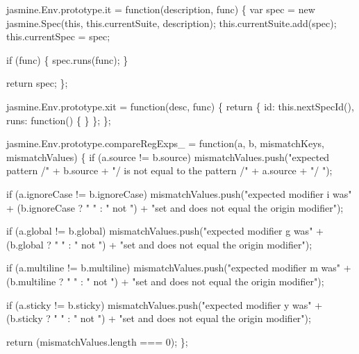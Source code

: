 \begin{DoxyCodeInclude}
jasmine.Env.prototype.it = \textcolor{keyword}{function}(description, func) \{
  var spec = \textcolor{keyword}{new} jasmine.Spec(\textcolor{keyword}{this}, this.currentSuite, description);
  this.currentSuite.add(spec);
  this.currentSpec = spec;

  \textcolor{keywordflow}{if} (func) \{
    spec.runs(func);
  \}

  \textcolor{keywordflow}{return} spec;
\};

jasmine.Env.prototype.xit = \textcolor{keyword}{function}(desc, func) \{
  \textcolor{keywordflow}{return} \{
    \textcolor{keywordtype}{id}: this.nextSpecId(),
    runs: \textcolor{keyword}{function}() \{
    \}
  \};
\};

jasmine.Env.prototype.compareRegExps\_ = \textcolor{keyword}{function}(a, b, mismatchKeys, mismatchValues) \{
  \textcolor{keywordflow}{if} (a.source != b.source)
    mismatchValues.push(\textcolor{stringliteral}{"expected pattern /"} + b.source + \textcolor{stringliteral}{"/ is not equal to the pattern /"} + a.source + \textcolor{stringliteral}{"/
      "});

  \textcolor{keywordflow}{if} (a.ignoreCase != b.ignoreCase)
    mismatchValues.push(\textcolor{stringliteral}{"expected modifier i was"} + (b.ignoreCase ? \textcolor{stringliteral}{" "} : \textcolor{stringliteral}{" not "}) + \textcolor{stringliteral}{"set and does not
       equal the origin modifier"});

  \textcolor{keywordflow}{if} (a.global != b.global)
    mismatchValues.push(\textcolor{stringliteral}{"expected modifier g was"} + (b.global ? \textcolor{stringliteral}{" "} : \textcolor{stringliteral}{" not "}) + \textcolor{stringliteral}{"set and does not equal
       the origin modifier"});

  \textcolor{keywordflow}{if} (a.multiline != b.multiline)
    mismatchValues.push(\textcolor{stringliteral}{"expected modifier m was"} + (b.multiline ? \textcolor{stringliteral}{" "} : \textcolor{stringliteral}{" not "}) + \textcolor{stringliteral}{"set and does not equal
       the origin modifier"});

  \textcolor{keywordflow}{if} (a.sticky != b.sticky)
    mismatchValues.push(\textcolor{stringliteral}{"expected modifier y was"} + (b.sticky ? \textcolor{stringliteral}{" "} : \textcolor{stringliteral}{" not "}) + \textcolor{stringliteral}{"set and does not equal
       the origin modifier"});

  \textcolor{keywordflow}{return} (mismatchValues.length === 0);
\};


\end{DoxyCodeInclude}
